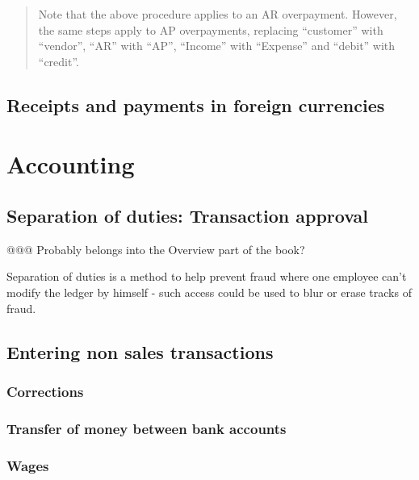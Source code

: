 \begin{quotation}
Note that the above procedure applies to an AR overpayment. However, the same steps apply to
AP overpayments, replacing ``customer'' with ``vendor'', ``AR'' with ``AP'', ``Income'' with
``Expense'' and ``debit'' with ``credit''.
\end{quotation}

\section{Receipts and payments in foreign currencies}
\label{sec-workflows-payment-processing-fx-payments}

\chapter{Accounting}
\label{cha-workflows-accounting}

\section{Separation of duties: Transaction approval}
\label{sec-workflows-accounting-transaction-approval}
@@@ Probably belongs into the Overview part of the book?

Separation of duties is a method to help prevent fraud where one employee can't modify the
ledger by himself - such access could be used to blur or erase tracks of fraud.

\section{Entering non sales transactions}
\label{sec-workflows-accounting-transaction-entry}

\subsection{Corrections}
\label{subsec-workflows-accounting-correction-transaction-entry}

\subsection{Transfer of money between bank accounts}
\label{subsec-workflows-accounting-entry-bank-to-bank-transactions}

\subsection{Wages}
\label{subsec-workflows-accounting-entry-of-wages}

